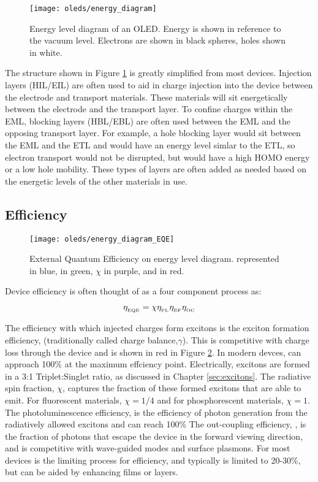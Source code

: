 \documentclass[../thesis.tex]{subfiles}
\begin{document}
\begin{figure}[ht]
\centering
\texttt{[image: oleds/energy\_diagram]}
\caption{Energy level diagram of an OLED.  Energy is shown in reference to the vacuum level.  Electrons are shown in black spheres, holes shown in white.}
\label{fig:oleds_energy_level_diagram}
\end{figure}

The structure shown in Figure \ref{fig:oleds_energy_level_diagram} is greatly simplified from most devices.
Injection layers (HIL/EIL) are often used to aid in charge injection into the device between the electrode and transport materials.
These materials will sit energetically between the electrode and the transport layer.
To confine charges within the EML, blocking layers (HBL/EBL) are often used between the EML and the opposing transport layer.
For example, a hole blocking layer would sit between the EML and the ETL and would have an energy level simlar to the ETL, so electron transport would not be disrupted, but would have a high HOMO energy or a low hole mobility.
These types of layers are often added as needed based on the energetic levels of the other materials in use.

\subsection{Efficiency}

\begin{figure}[ht]
\centering
\texttt{[image: oleds/energy\_diagram\_EQE]}
\caption{External Quantum Efficiency on energy level diagram.  \oc represented in blue, \pl in green, $\chi$ in purple, and \ef in red.}
\label{fig:oleds_energy_level_diagram_EQE}
\end{figure}

Device efficiency is often thought of as a four component process as:\supercite{Baldo1998a}

\begin{equation}
\eta_{_\text{\tiny EQE}}=\chi\eta_{_\text{\tiny PL}}\eta_{_\text{\tiny EF}}\eta_{_\text{\tiny OC}}
\label{eqn:eqe}
\end{equation}

The efficiency with which injected charges form excitons is the exciton formation efficiency, \ef (traditionally called charge balance,$\gamma$).
This is competitive with charge loss through the device and is shown in red in Figure \ref{fig:oleds_energy_level_diagram_EQE}.
In modern devces, \ef can approach 100\% at the maximum effciency point.
Electrically, excitons are formed in a 3:1 Triplet:Singlet ratio, as discussed in Chapter \ref{sec:excitons}.
The radiative spin fraction, $\chi$, captures the fraction of these formed excitons that are able to emit.
For fluorescent materials, $\chi=1/4$ and for phosphorescent materials, $\chi=1$.
The photoluminescence efficiency, \pl is the efficiency of photon generation from the radiatively allowed excitons and can reach 100\%
The out-coupling efficiency, \oc, is the fraction of photons that escape the device in the forward viewing direction, and is competitive with wave-guided modes and surface plasmons.\supercite{Furno2010,Furno2012}
For most devices \oc is the limiting process for efficiency, and typically is limited to 20-30\%, but can be aided by enhancing films or layers.
\end{document}
